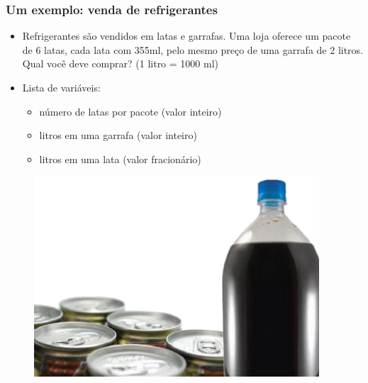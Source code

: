\documentclass[xcolor={dvipsnames,table},aspectratio=169]{beamer}
\begin{document}
\begin{frame}\frametitle{Um exemplo: venda de refrigerantes}
\begin{itemize}
	\item Refrigerantes são vendidos em latas e garrafas. Uma loja oferece um pacote de 6 latas, cada lata com 355ml, pelo mesmo preço de uma garrafa de 2 litros. Qual você deve comprar? (1 litro = 1000 ml)
	\item Lista de variáveis:
	\begin{itemize}
		\item número de latas por pacote (valor inteiro)
		\item litros em uma garrafa (valor inteiro)
		\item litros em uma lata (valor fracionário)
	\end{itemize}
\end{itemize}
\begin{figure}[h]
	\includegraphics[height=0.3\paperheight,right]{pucrs-ep-fprog-unidade_02-tipos_de_dados_fundamentais-laminas-refrigerantes.png}
\end{figure}
\end{frame}
\end{document}

